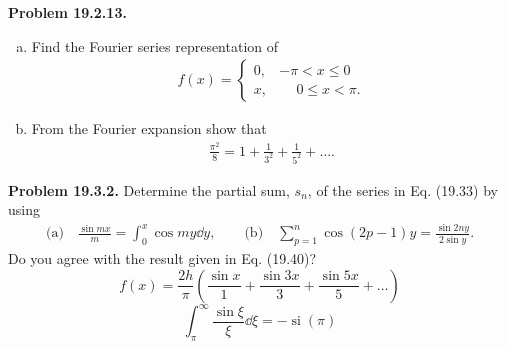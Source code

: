\documentclass{article}
\begin{document}
\hrulefill

\textbf{Problem 19.2.13.} 
\begin{enumerate}[(a)]
    \item Find the Fourier series representation of
    \begin{equation*}
    \begin{aligned}
        f(x) =
        \begin{cases}
            0, &-\pi<x\leq 0 \\[1em]
            x, &\phantom{-}0\leq x<\pi.
        \end{cases}
    \end{aligned}
    \end{equation*}

    \item From the Fourier expansion show that
    \begin{equation*}
    \begin{aligned}
        \frac{\pi^2}{8} = 1 + \frac{1}{3^2} + \frac{1}{5^2} + \ldots .
    \end{aligned}
    \end{equation*}
        
\end{enumerate}

\hrulefill

\textbf{Problem 19.3.2.} Determine the partial sum, $s_n$, of the series in Eq. (19.33) by using
\begin{equation*}
\begin{aligned}
    \text{(a)}\quad \frac{\sin mx}{m} = \int_0^x \cos my\dd y,\quad\quad\text{(b)}\quad \sum_{p=1}^n \cos(2p-1)y = \frac{\sin 2ny}{2\sin y}.
\end{aligned}
\end{equation*}
Do you agree with the result given in Eq. (19.40)?
\begin{equation}
    f(x) = \frac{2h}{\pi}\left(\frac{\sin x}{1} + \frac{\sin 3x}{3} + \frac{\sin 5x}{5} + \ldots\right) \tag{19.33}\label{eq:19.33}
\end{equation}
\begin{equation}
    \int_\pi^\infty \frac{\sin\xi}{\xi}\dd\xi = -\mathop{\text{si}}{(\pi)} \tag{19.40}\label{eq:19.40}
\end{equation}
\end{document}
